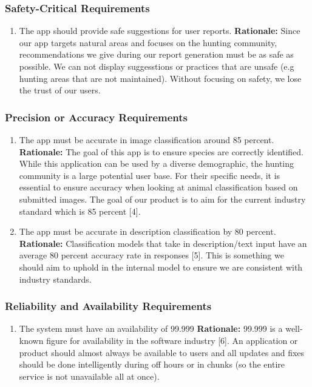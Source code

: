 \documentclass[]{article}
\begin{document}
\subsubsection{Safety-Critical Requirements}
\label{ssub:safety_critical_requirements}
\begin{enumerate}[{PR-SC}1. ]
	\item The app should provide safe suggestions for user reports.
	\newline \textbf{Rationale:} Since our app targets natural areas and focuses on the hunting community, recommendations we give during our report generation must be as safe as possible. We can not display suggesstions or practices that are unsafe (e.g hunting areas that are not maintained). Without focusing on safety, we lose the trust of our users.
\end{enumerate}

\subsubsection{Precision or Accuracy Requirements}
\label{ssub:precision_or_accuracy_requirements}
\begin{enumerate}[{PR-PA}1. ]
	\item The app must be accurate in image classification around 85 percent.
	\newline \textbf{Rationale:} The goal of this app is to ensure species are correctly identified. While this application can be used by a diverse demographic, the hunting community is a large potential user base. For their specific needs, it is essential to ensure accuracy when looking at animal classification based on submitted images. The goal of our product is to aim for the current industry standard which is 85 percent [4]. 
	\item The app must be accurate in description classification by 80 percent. 
	\newline \textbf{Rationale:} Classification models that take in description/text input have an average 80 percent accuracy rate in responses [5]. This is something we should aim to uphold in the internal model to ensure we are consistent with industry standards. 
\end{enumerate}

\subsubsection{Reliability and Availability Requirements}
\label{ssub:reliability_and_availability_requirements}
\begin{enumerate}[{PR-RA}1. ]
	\item The system must have an availability of 99.999
	\newline \textbf{Rationale:} 99.999 is a well-known figure for availability in the software industry [6]. An application or product should almost always be available to users and all updates and fixes should be done intelligently during off hours or in chunks (so the entire service is not unavailable all at once). 
\end{enumerate}
\end{document}
